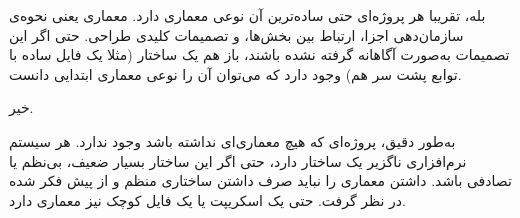 
بله، تقریبا هر پروژه‌ای حتی ساده‌ترین آن نوعی معماری دارد. معماری یعنی نحوه‌ی سازمان‌دهی اجزا، ارتباط بین بخش‌ها، و تصمیمات کلیدی طراحی. حتی اگر این تصمیمات به‌صورت آگاهانه گرفته نشده باشند، باز هم یک ساختار (مثلا یک فایل ساده با توابع پشت سر هم) وجود دارد که می‌توان آن را نوعی معماری ابتدایی دانست.


خیر.


به‌طور دقیق، پروژه‌ای که هیچ معماری‌ای نداشته باشد وجود ندارد. هر سیستم نرم‌افزاری ناگزیر یک ساختار دارد، حتی اگر این ساختار بسیار ضعیف، بی‌نظم یا تصادفی باشد.
داشتن معماری را نباید صرف داشتن ساختاری منظم و از پیش فکر شده در نظر گرفت. حتی یک اسکریپت یا یک فایل کوچک نیز معماری دارد.
